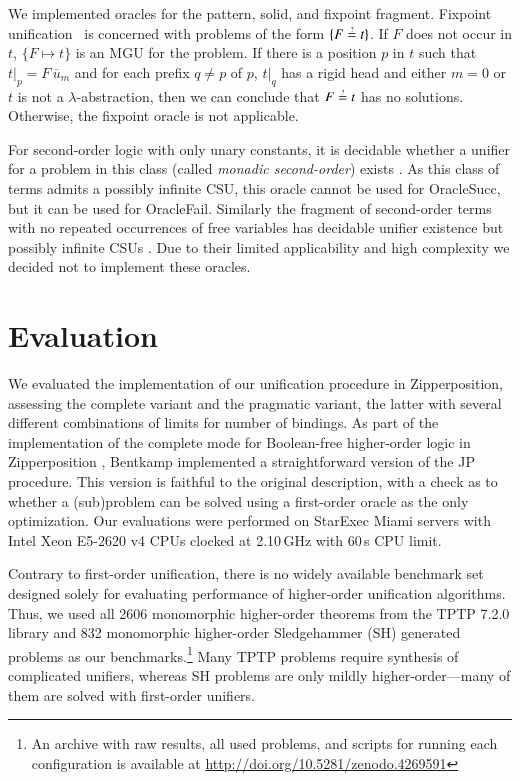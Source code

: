 We implemented oracles for the pattern, solid, and fixpoint fragment. 
Fixpoint unification~\cite{gh-75-unification} is concerned with problems of the form
$\{F \unif t\}$. If $F$ does not occur in $t$, $\{ F \mapsto t \}$
is an MGU for the problem. If there is a position $p$ in $t$ such that 
$t|_p = F \, \overline{u}_m$
and for each prefix $q\neq p$ of $p$, $t|_q$ has a rigid head and either $m=0$ or $t$ is not a $\lambda$-abstraction,
then we can conclude that $F \unif t$ has no solutions. Otherwise,
the fixpoint oracle is not applicable.

For second-order logic with only unary constants, it is decidable whether
a unifier for a problem in this class (called
\emph{monadic second-order}) exists \cite{wf-88-monadicunif}. As this class of terms admits a
possibly infinite CSU, this oracle cannot be used for \textsf{OracleSucc},
but it can be used for \textsf{OracleFail}. Similarly the fragment of
second-order terms with no repeated occurrences of free variables has decidable
unifier existence but possibly infinite CSUs
\cite{gd-01-unif-chapter}. Due to their limited applicability and high complexity we
decided not to implement these oracles.



\section{Evaluation}
\label{sec:unif:evaluation}We evaluated the implementation of our unification procedure in Zipperposition,
assessing the complete variant and the pragmatic variant, the latter with several
different combinations of limits for number of bindings. As part of the
implementation of the complete mode for Boolean-free higher-order logic in
Zipperposition \cite{bbtvw-21-sup-lam}, Bentkamp implemented a straightforward
version of the JP procedure. This version is faithful to the original description,
with a check as to whether a (sub)problem can be solved using a first-order oracle
as the only optimization. Our evaluations were performed on StarExec Miami
\cite{sst-14-starexec} servers with Intel Xeon E5-{2620 v4} CPUs clocked at {2.10}\,GHz with 60\,s CPU limit.

Contrary to first-order unification, there is no widely available benchmark set 
designed solely for evaluating performance of higher-order
unification algorithms. Thus, we used all 2606 monomorphic higher-order theorems
from the TPTP 7.2.0 library \cite{gs-17-tptp} and 832 monomorphic higher-order
Sledgehammer (SH) generated problems \cite{ns-13-leo2sh} as our benchmarks.\footnote{An archive with raw
results, all used problems, and scripts for running each configuration is
available at \url{http://doi.org/10.5281/zenodo.4269591}}
Many TPTP problems require synthesis of complicated unifiers,
whereas SH problems are only mildly higher-order---many of them are
solved with first-order unifiers.

